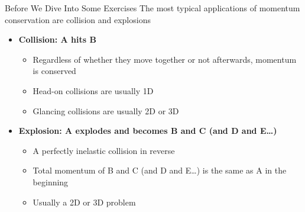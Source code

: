 \documentclass[12pt,compress,aspectratio=169]{beamer}
\begin{document}



\begin{frame}{Before We Dive Into Some Exercises}
  The most typical applications of momentum conservation are collision and
  explosions
  \begin{itemize}
  \item\textbf{Collision: A hits B}
    \begin{itemize}
    \item Regardless of whether they move together or not afterwards, momentum
      is conserved
    \item Head-on collisions are usually 1D
    \item Glancing collisions are usually 2D or 3D
    \end{itemize}
  \item\textbf{Explosion: A explodes and becomes B and C (and D and E\ldots)}
    \begin{itemize}
    \item A perfectly inelastic collision in reverse
    \item Total momentum of B and C (and D and E\ldots) is the same as A in the
      beginning
    \item Usually a 2D or 3D problem
    \end{itemize}
  \end{itemize}
\end{frame}



\end{document}
